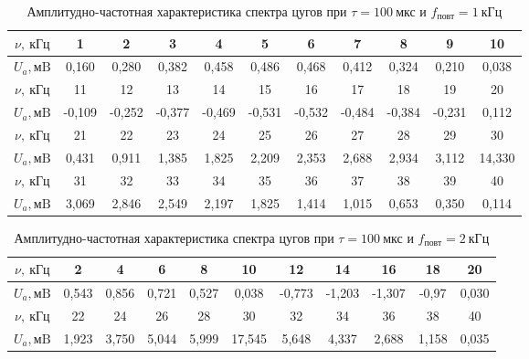 \begin{table}[H]
\centering
\begin{tabular}{|c|c|c|c|c|c|c|c|c|c|c|}
\hline
$\nu, \ \text{кГц}$ & 1      & 2      & 3      & 4      & 5      & 6      & 7      & 8      & 9      & 10     \\ \hline
$U_a, \text{мB}$ & 0,160  & 0,280  &
0,382  & 0,458  & 0,486  & 0,468  &
0,412  & 0,324  & 0,210  & 0,038  \\
\hline \hline
$\nu, \ \text{кГц}$ & 11     & 12     & 13     & 14     & 15     & 16     & 17     & 18     & 19     & 20     \\ \hline
$U_a, \text{мB}$ & -0,109 & -0,252 &
-0,377 & -0,469 & -0,531 & -0,532 &
-0,484 & -0,384 & -0,231 & 0,112  \\
\hline \hline
$\nu, \ \text{кГц}$ & 21     & 22     & 23     & 24     & 25     & 26     & 27     & 28     & 29     & 30     \\ \hline
$U_a, \text{мB}$ & 0,431  & 0,911  &
1,385  & 1,825  & 2,209  & 2,353  &
2,688  & 2,934  & 3,112  & 14,330 \\
\hline \hline
$\nu, \ \text{кГц}$ & 31     & 32     & 33     & 34     & 35     & 36     & 37     & 38     & 39     & 40     \\ \hline
$U_a, \text{мB}$ & 3,069  & 2,846  & 2,549  & 2,197  & 1,825  & 1,414  & 1,015  & 0,653  & 0,350  & 0,114  \\ \hline
\end{tabular}
\captionsetup{justification=centering}
\caption{Амплитудно-частотная
характеристика спектра цугов при $\tau = 100 \
\text{мкс}$ и $f_\text{повт} = 1 \
\text{кГц}$}
\end{table}

\begin{table}[H]
\centering
\begin{tabular}{|c|c|c|c|c|c|c|c|c|c|c|}
\hline
$\nu, \ \text{кГц}$ & 2     & 4     & 6     & 8     & 10     & 12     & 14     & 16     & 18     & 20    \\ \hline
$U_a, \text{мB}$  & 0,543 & 0,856 & 0,721
& 0,527 & 0,038  & -0,773 & -1,203 &
-1,307 & -0,97 & 0,030 \\ \hline \hline
$\nu, \ \text{кГц}$ & 22    & 24    & 26    & 28    & 30     & 32     & 34     & 36     & 38     & 40    \\ \hline
$U_a, \text{мB}$  & 1,923 & 3,750 & 5,044 & 5,999 & 17,545 & 5,648  & 4,337  & 2,688  & 1,158  & 0,035 \\ \hline
\end{tabular}
\captionsetup{justification=centering}
\caption{Амплитудно-частотная
характеристика спектра цугов при $\tau = 100 \
\text{мкс}$ и $f_\text{повт} = 2 \
\text{кГц}$}
\end{table}


